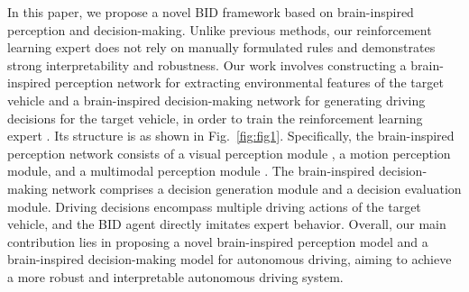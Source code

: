In this paper, we propose a novel BID framework based on brain-inspired perception and decision-making. 
Unlike previous methods, our reinforcement learning expert does not rely on manually formulated rules and demonstrates strong interpretability and robustness. 
Our work involves constructing a brain-inspired perception network for extracting environmental features of the target vehicle and a brain-inspired decision-making network for generating driving decisions for the target vehicle, in order to train the reinforcement learning expert \cite{kahn2021land}. 
Its structure is as shown in Fig.~\ref{fig:fig1}. 
Specifically, the brain-inspired perception network consists of a visual perception module \cite{al2018brain}, a motion perception module, and a multimodal perception module \cite{yu2023brain}. 
The brain-inspired decision-making network comprises a decision generation module \cite{schirner2023learning} and a decision evaluation module. 
Driving decisions encompass multiple driving actions of the target vehicle, and the BID agent directly imitates expert behavior. 
Overall, our main contribution lies in proposing a novel brain-inspired perception model and a brain-inspired decision-making model for autonomous driving, aiming to achieve a more robust and interpretable autonomous driving system.





